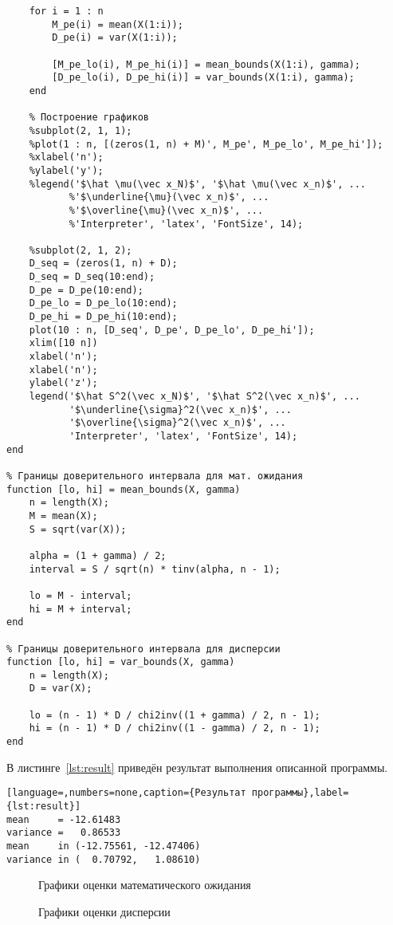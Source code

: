 \begin{lstlisting}[caption={Текст программы},label={lst:programm}]
    % Заполнение созданных массивов
    for i = 1 : n
        M_pe(i) = mean(X(1:i));
        D_pe(i) = var(X(1:i));

        [M_pe_lo(i), M_pe_hi(i)] = mean_bounds(X(1:i), gamma);
        [D_pe_lo(i), D_pe_hi(i)] = var_bounds(X(1:i), gamma);
    end

    % Построение графиков
    %subplot(2, 1, 1);
    %plot(1 : n, [(zeros(1, n) + M)', M_pe', M_pe_lo', M_pe_hi']);
    %xlabel('n');
    %ylabel('y');
    %legend('$\hat \mu(\vec x_N)$', '$\hat \mu(\vec x_n)$', ...
           %'$\underline{\mu}(\vec x_n)$', ...
           %'$\overline{\mu}(\vec x_n)$', ...
           %'Interpreter', 'latex', 'FontSize', 14);

    %subplot(2, 1, 2);
    D_seq = (zeros(1, n) + D);
    D_seq = D_seq(10:end);
    D_pe = D_pe(10:end);
    D_pe_lo = D_pe_lo(10:end);
    D_pe_hi = D_pe_hi(10:end);
    plot(10 : n, [D_seq', D_pe', D_pe_lo', D_pe_hi']);
    xlim([10 n])
    xlabel('n');
    xlabel('n');
    ylabel('z');
    legend('$\hat S^2(\vec x_N)$', '$\hat S^2(\vec x_n)$', ...
           '$\underline{\sigma}^2(\vec x_n)$', ...
           '$\overline{\sigma}^2(\vec x_n)$', ...
           'Interpreter', 'latex', 'FontSize', 14);
end

% Границы доверительного интервала для мат. ожидания
function [lo, hi] = mean_bounds(X, gamma)
    n = length(X);
    M = mean(X);
    S = sqrt(var(X));

    alpha = (1 + gamma) / 2;
    interval = S / sqrt(n) * tinv(alpha, n - 1);

    lo = M - interval;
    hi = M + interval;
end

% Границы доверительного интервала для дисперсии
function [lo, hi] = var_bounds(X, gamma)
    n = length(X);
    D = var(X);

    lo = (n - 1) * D / chi2inv((1 + gamma) / 2, n - 1);
    hi = (n - 1) * D / chi2inv((1 - gamma) / 2, n - 1);
end
\end{lstlisting}

В листинге~\ref{lst:result} приведён результат выполнения описанной программы.
\begin{lstlisting}[language=,numbers=none,caption={Результат программы},label={lst:result}]
mean     = -12.61483
variance =   0.86533
mean     in (-12.75561, -12.47406)
variance in (  0.70792,   1.08610)
\end{lstlisting}

\begin{figure}[H]
    \caption{Графики оценки математического ожидания}\label{img:plot01}

    
\end{figure}

\begin{figure}[H]
    \caption{Графики оценки дисперсии}\label{img:plot02}
    
\end{figure}

